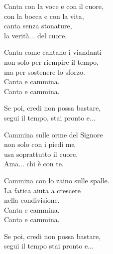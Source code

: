 
\strofa Canta con la voce e con il cuore,\\
con la bocca e con la vita,\\
canta senza stonature,\\
la verità... del cuore.

\spazio

Canta come cantano i viandanti\\
non solo per riempire il tempo,\\
ma per sostenere lo sforzo.\\
Canta e cammina.\\
Canta e cammina.

\spazio

Se poi, credi non possa bastare,\\
segui il tempo, stai pronto e...

\spazio


\spazio

\strofa Cammina sulle orme del Signore\\
non solo con i piedi ma\\
usa soprattutto il cuore.\\
Ama... chi è con te.

\spazio

Cammina con lo zaino sulle spalle.\\
La fatica aiuta a crescere\\
nella condivisione.\\
Canta e cammina.\\
Canta e cammina.

\spazio

Se poi, credi non possa bastare,\\
segui il tempo stai pronto e...

\spazio

